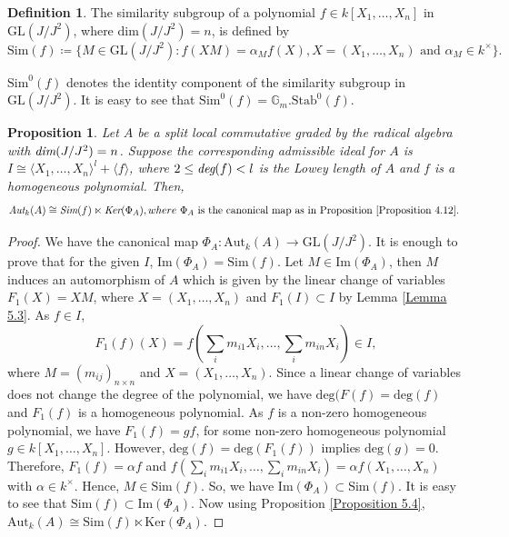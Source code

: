 \documentclass[12pt]{amsart}
\newtheorem{proposition}[theorem]{Proposition}
\theoremstyle{definition}
\newtheorem{definition}[theorem]{Definition}
\numberwithin{equation}{section}
\begin{document}
\vskip4mm
\begin{definition}\label{Definition 5.11}
The similarity subgroup of a polynomial $f\in k[X_1,\dots,X_n]$ in $\text{GL}(J/J^2)$, where $\text{dim}(J/J^2)=n$, is defined by \[\text{Sim}(f)\coloneq\{M\in \text{GL}(J/J^2): f(XM)=\alpha_M f(X), X=(X_1,\dots,X_n)\text{ and } \alpha_M\in k^{\times}\}.\]
\end{definition}
\noindent
$\text{Sim}^{0}(f)$ denotes the identity component of the similarity subgroup in $\text{GL}(J/J^2)$. It is easy to see that $\text{Sim}^{0}(f)=\mathbb{G}_m.\text{Stab}^{0}(f)$.


\vskip2mm
\begin{proposition}\label{Proposition 5.12}
Let $A$ be a split local commutative graded by the radical algebra with $\emph{dim}(J/J^2)=n$. Suppose the corresponding admissible ideal for $A$ is $I\cong\langle X_1,\dots, X_n \rangle^l+\langle f\rangle$, where $2\leq \emph{\text{deg}}(f)< l$ is the Lowey length of $A$ and $f$ is a homogeneous polynomial.  Then,
\begin{equation*}\label{eq23}
\emph{Aut}_k(A)\cong \emph{Sim}(f)\ltimes \emph{\text{Ker}}(\Phi_A), where \text{ $\Phi_A$ is the canonical map as in Proposition \ref{Proposition 4.12}. }
\end{equation*}
\end{proposition}

\vskip1mm
\begin{proof}
We have the canonical map $\Phi_A: \text{Aut}_k(A)\rightarrow\text{GL}(J/J^2)$. It is enough to prove that for the given $I$, $\text{Im}(\Phi_A)=\text{Sim}(f)$. Let $M\in \text{Im}(\Phi_A)$, then $M$ induces an automorphism of  $A$ which is given by the linear change of variables $F_1(X)=XM$, where $X=(X_1,\dots,X_n)$ and $F_1(I)\subset I$ by Lemma \ref{Lemma 5.3}. As $f\in I$, \[F_1(f)(X)=f(\sum_{i}m_{i1}X_i,\dots,\sum_{i}m_{in}X_i)\in I,\] where $M=(m_{ij})_{n\times n}$ and $X=(X_1,\dots,X_n)$. Since a linear change of variables does not change the degree of the polynomial, we have $\text{deg}(F(f)=\text{deg}(f)$ and $F_1(f)$ is a homogeneous polynomial. As $f$ is a non-zero homogeneous polynomial, we have $F_1(f)=gf$, for some non-zero homogeneous polynomial $g\in k[X_1,\dots,X_n]$. However, $\text{deg}(f)=\text{deg}(F_1(f))$ implies $\text{deg}(g)=0$. Therefore,
$F_1(f)=\alpha f$ and $f(\sum_{i}m_{i1}X_i,\dots,\sum_{i}m_{in}X_i)=\alpha f(X_1,\dots,X_n)$ with $\alpha\in k^{\times}$.
Hence, $M\in \text{Sim}(f)$. So, we have $\text{Im}(\Phi_A)\subset \text{Sim}(f)$. It is easy to see that $\text{Sim}(f)\subset \text{Im}(\Phi_A)$. Now using Proposition \ref{Proposition 5.4}, $\text{Aut}_k(A)\cong \text{Sim}(f)\ltimes \text{Ker}(\Phi_A)$.
\end{proof}
\end{document}
